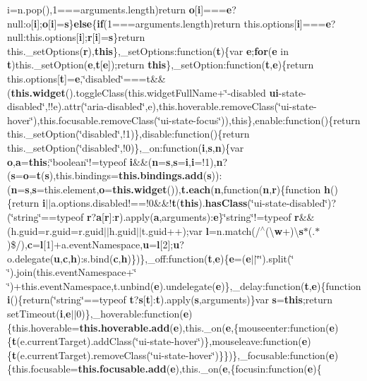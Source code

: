 {{i}=n.\+pop(),1===arguments.\+length)return {\bf o}\mbox{[}{\bf i}\mbox{]}==={\bf e}?null\+:o\mbox{[}{\bf i}\mbox{]};{\bf o}\mbox{[}{\bf i}\mbox{]}={\bf s}\}{\bf else}\{{\bf if}(1===arguments.\+length)return this.\+options\mbox{[}{\bf i}\mbox{]}==={\bf e}?null\+:this.\+options\mbox{[}{\bf i}\mbox{]};{\bf r}\mbox{[}{\bf i}\mbox{]}={\bf s}\}return this.\+\_\+set\+Options({\bf r}),{\bf this}\},\+\_\+set\+Options\+:function({\bf t})\{var {\bf e};{\bf for}({\bf e} in {\bf t})this.\+\_\+set\+Option({\bf e},{\bf t}\mbox{[}{\bf e}\mbox{]});return {\bf this}\},\+\_\+set\+Option\+:function({\bf t},{\bf e})\{return this.\+options\mbox{[}{\bf t}\mbox{]}={\bf e},\char`\"{}disabled\char`\"{}===t\&\&({\bf this.\+widget}().toggle\+Class(this.\+widget\+Full\+Name+\char`\"{}-\/disabled {\bf ui}-\/state-\/disabled\char`\"{},!!e).attr(\char`\"{}aria-\/disabled\char`\"{},e),this.\+hoverable.\+remove\+Class(\char`\"{}ui-\/state-\/hover\char`\"{}),this.\+focusable.\+remove\+Class(\char`\"{}ui-\/state-\/focus\char`\"{})),this\},enable\+:function()\{return this.\+\_\+set\+Option(\char`\"{}disabled\char`\"{},!1)\},disable\+:function()\{return this.\+\_\+set\+Option(\char`\"{}disabled\char`\"{},!0)\},\+\_\+on\+:function({\bf i},{\bf s},{\bf n})\{var {\bf o},{\bf a}={\bf this};\char`\"{}boolean\char`\"{}!=typeof {\bf i}\&\&({\bf n}={\bf s},{\bf s}={\bf i},{\bf i}=!1),{\bf n}?({\bf s}={\bf o}={\bf t}({\bf s}),this.\+bindings={\bf this.\+bindings.\+add}({\bf s}))\+:({\bf n}={\bf s},{\bf s}=this.\+element,{\bf o}={\bf this.\+widget}()),{\bf t.\+each}({\bf n},function({\bf n},{\bf r})\{function {\bf h}()\{return {\bf i}$\vert$$\vert$a.\+options.\+disabled!==!0\&\&!{\bf t}({\bf this}).{\bf has\+Class}(\char`\"{}ui-\/state-\/disabled\char`\"{})?(\char`\"{}string\char`\"{}==typeof {\bf r}?{\bf a}\mbox{[}{\bf r}\mbox{]}\+:{\bf r}).apply({\bf a},arguments)\+:{\bf e}\}\char`\"{}string\char`\"{}!=typeof {\bf r}\&\&(h.\+guid=r.\+guid=r.\+guid$\vert$$\vert$h.\+guid$\vert$$\vert$t.\+guid++);var {\bf l}=n.\+match(/$^\wedge$(\textbackslash{}{\bf w}+)\textbackslash{}{\bf s}$\ast$(.$\ast$)\$/),{\bf c}={\bf l}\mbox{[}1\mbox{]}+a.\+event\+Namespace,{\bf u}={\bf l}\mbox{[}2\mbox{]};{\bf u}?o.\+delegate({\bf u},{\bf c},{\bf h})\+:s.\+bind({\bf c},{\bf h})\})\},\+\_\+off\+:function({\bf t},{\bf e})\{{\bf e}=({\bf e}$\vert$$\vert$\char`\"{}\char`\"{}).split(\char`\"{} \char`\"{}).join(this.\+event\+Namespace+\char`\"{} \char`\"{})+this.\+event\+Namespace,t.\+unbind({\bf e}).undelegate({\bf e})\},\+\_\+delay\+:function({\bf t},{\bf e})\{function {\bf i}()\{return(\char`\"{}string\char`\"{}==typeof {\bf t}?{\bf s}\mbox{[}{\bf t}\mbox{]}\+:{\bf t}).apply({\bf s},arguments)\}var {\bf s}={\bf this};return set\+Timeout({\bf i},{\bf e}$\vert$$\vert$0)\},\+\_\+hoverable\+:function({\bf e})\{this.\+hoverable={\bf this.\+hoverable.\+add}({\bf e}),this.\+\_\+on({\bf e},\{mouseenter\+:function({\bf e})\{{\bf t}(e.\+current\+Target).add\+Class(\char`\"{}ui-\/state-\/hover\char`\"{})\},mouseleave\+:function({\bf e})\{{\bf t}(e.\+current\+Target).remove\+Class(\char`\"{}ui-\/state-\/hover\char`\"{})\}\})\},\+\_\+focusable\+:function({\bf e})\{this.\+focusable={\bf this.\+focusable.\+add}({\bf e}),this.\+\_\+on({\bf e},\{focusin\+:function({\bf e})\{{\bf }}

